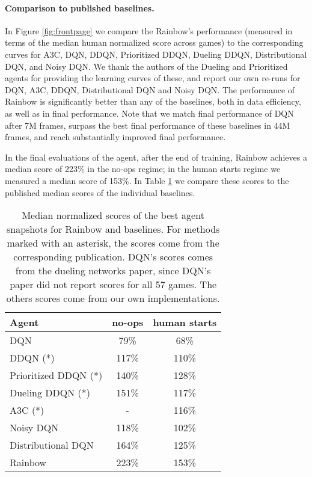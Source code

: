 \documentclass[letterpaper]{article} %
\begin{document}
\paragraph{Comparison to published baselines.}
In Figure \ref{fig:frontpage} we compare the Rainbow's performance (measured in terms of the median human normalized score across games) to the corresponding curves for A3C, DQN, DDQN, Prioritized DDQN, Dueling DDQN, Distributional DQN, and Noisy DQN. We thank the authors of the Dueling and Prioritized agents for providing the learning curves of these, and report our own re-runs for DQN, A3C, DDQN, Distributional DQN and Noisy DQN. The performance of Rainbow is significantly better than any of the baselines, both in data efficiency, as well as in final performance. Note that we match final performance of DQN after 7M frames, surpass the best final performance of these baselines in 44M frames, and reach substantially improved final performance.

In the final evaluations of the agent, after the end of training, Rainbow achieves a median score of 223\% in the no-ops regime; in the human starts regime we measured a median score of 153\%. In Table \ref{fig:end_of_training_scores} we compare these scores to the published median scores of the individual baselines.

\begin{table}[b!]
\vspace{-0.5em}
\centering
\begin{tabular}{ | l | c c |}
\hline
Agent           & no-ops &  human starts \\
\hline
\hline
 DQN              & 79\%           & 68\% \\
 DDQN (*)            & 117\%          & 110\% \\
 Prioritized DDQN (*)      & 140\%          & 128\% \\
 Dueling DDQN (*)          & 151\%          & 117\% \\
 A3C (*)              &   -     & 116\%     \\
 Noisy DQN          & 118\%           & 102\%   \\
 Distributional DQN   & 164\%          & 125\% \\
 \hline
 Rainbow          & 223\%          & 153\% \\
 \hline

\end{tabular}
\caption{Median normalized scores of the best agent snapshots for Rainbow and baselines.  For methods marked with an asterisk, the scores come from the corresponding publication. DQN's scores comes from the dueling networks paper, since DQN's paper did not report scores for all 57 games. The others scores come from our own implementations. 
}
\label{fig:end_of_training_scores}
\end{table}
\end{document}
